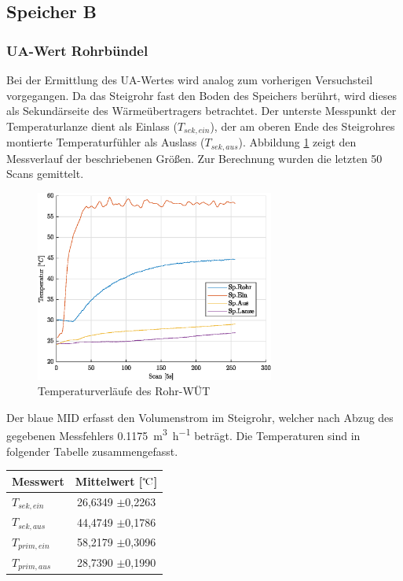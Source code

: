 \subsection{Speicher B}
\subsubsection{UA-Wert Rohrbündel}
Bei der Ermittlung des UA-Wertes wird analog zum vorherigen Versuchsteil vorgegangen. Da das Steigrohr fast den  Boden des Speichers berührt, wird dieses als Sekundärseite des Wärmeübertragers betrachtet. Der unterste Messpunkt der Temperaturlanze dient als Einlass ($T_{sek,ein}$), der am oberen Ende des Steigrohres montierte Temperaturfühler als Auslass ($T_{sek,aus}$). Abbildung \ref{fig:intWT} zeigt den Messverlauf der beschriebenen Größen. Zur Berechnung wurden die letzten 50 Scans gemittelt.

\begin{figure}[H]
	\centering
	\includegraphics[width=0.7\textwidth]{../DATA/RohrWT_B.eps}
	\caption[Temperaturverläufe des Rohr-WÜT]{Temperaturverläufe des Rohr-WÜT}
	\label{fig:intWT}
\end{figure}

Der blaue MID erfasst den Volumenstrom im Steigrohr, welcher nach Abzug des gegebenen Messfehlers \SI{0,1175}{\cubic\meter\per\hour} beträgt. Die Temperaturen sind in folgender Tabelle zusammengefasst.
\begin{center}
	\begin{tabular}{l|c}
		\label{tab:intWT}
		
		\textbf{Messwert} & \textbf{Mittelwert} [${\celsius}$] \\
		\hline
		$T_{sek,ein}$ & 26,6349 $\pm$0,2263\\
		$T_{sek,aus}$ & 44,4749 $\pm$0,1786\\
		$T_{prim,ein}$ & 58,2179 $\pm$0,3096\\
		$T_{prim,aus}$ & 28,7390 $\pm$0,1990\\
		
	\end{tabular}
\end{center}

